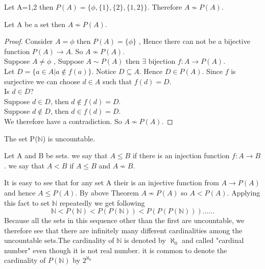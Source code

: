 \documentclass[a4paper,english,12pt]{article}   	%
\begin{document}
\begin{exmp} Let A={1,2} then $P(A)=\{ \phi,\{1\},\{2\},\{1,2\}\}$. Therefore $A \nsim P(A) $.
\end{exmp}
\begin{thm} Let A be a set then $A \nsim P(A) $.
\end{thm}
\begin{proof} Consider $A = \phi$ then $P(A) = \{ \phi \}$ , Hence there can not be a bijective function $P(A) \to A$. So $A \nsim P(A) $.\\
Suppose $A \neq \phi$ , Suppose $A \sim P(A)$ then $\exists$ bijection $f \colon A \to P(A)$.\\
Let $D=\{a \in A  | a \notin f(a)\}$. Notice $D \subseteq A$. Hence $D \in P(A)$. Since $f$ is surjective we can choose $d \in A$ such that $f(d)=D$.\\
Is $d \in D$?\\
Suppose $d \in D$, then $d \notin f(d)=D$.\\
Suppose $d \notin D$, then $d \in f(d)=D$.\\
We therefore have a contradiction. So $A \nsim P(A)$.
\end{proof}
\begin{cor} The set P($\mathbb{N}$) is uncountable.
\end{cor}
\begin{defn} Let A and B be sets. we say that $A \leq B$ if there is an injection function $f \colon A \to B$. we say that $A < B$ if $A \leq B$ and $A \nsim B$.
\end{defn}
It is easy to see that for any set A their is an injective function from $A \to P(A)$ and hence $A \leq P(A)$. By above Theorem $A \nsim P(A)$ so $A < P(A)$. Applying this fact to set $\mathbb{N}$ repeatedly we get following
\[ \mathbb{N} < P(\mathbb{N}) < P(P(\mathbb{N})) < P(P(P(\mathbb{N})))......\]
Because all the sets in this sequence other than the first are uncountable, we therefore see that there are infinitely many different cardinalities among the uncountable sets.The cardinality of $\mathbb{N}$ is denoted by $\aleph _{0}$ and called "cardinal number" even though it is not real number. it is common to denote the cardinality of $P(\mathbb{N})$ by  $ 2 ^{\aleph _{0}}$
\end{document}
